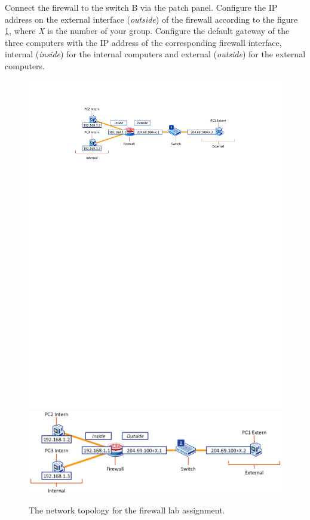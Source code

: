 Connect the firewall to the switch B via the patch panel. Configure the IP address on the external interface (\emph{outside}) of the firewall according to the figure \ref{fig:Firewall}, where \emph{X} is the number of your group. Configure the default gateway of the three computers with the IP address of the corresponding firewall interface, internal (\emph{inside}) for the internal computers and external (\emph{outside}) for the external computers.

\begin{figure}
\centering
\ifpdf
\includegraphics[width=0.9\linewidth]{Figures/Firewall.pdf}
\else
\includegraphics[width=0.9\linewidth]{Figures/Firewall.eps}
\fi
\caption{The network topology for the firewall lab assignment.}
\label{fig:Firewall}
\end{figure}

